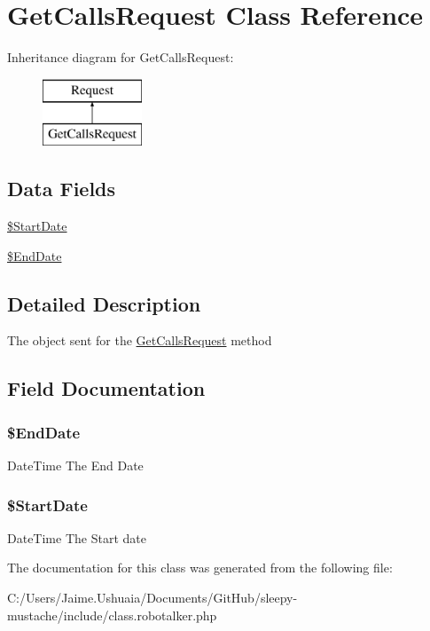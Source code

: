 \hypertarget{class_get_calls_request}{\section{Get\-Calls\-Request Class Reference}
\label{class_get_calls_request}
}
Inheritance diagram for Get\-Calls\-Request\-:\begin{figure}[H]
\begin{center}
\leavevmode
\includegraphics[height=2.000000cm]{class_get_calls_request}
\end{center}
\end{figure}
\subsection*{Data Fields}
\begin{DoxyCompactItemize}
\item 
\hyperlink{class_get_calls_request_a82e0539eeca49a1fbea42227a8f96d31}{\$\-Start\-Date}
\item 
\hyperlink{class_get_calls_request_a3ba74dcdb03b05077309a0b5a0c6788e}{\$\-End\-Date}
\end{DoxyCompactItemize}


\subsection{Detailed Description}
The object sent for the \hyperlink{class_get_calls_request}{Get\-Calls\-Request} method 

\subsection{Field Documentation}
\hypertarget{class_get_calls_request_a3ba74dcdb03b05077309a0b5a0c6788e}{
\subsubsection[{\$\-End\-Date}]{\setlength{\rightskip}{0pt plus 5cm}\$End\-Date}}\label{class_get_calls_request_a3ba74dcdb03b05077309a0b5a0c6788e}
Date\-Time The End Date \hypertarget{class_get_calls_request_a82e0539eeca49a1fbea42227a8f96d31}{
\subsubsection[{\$\-Start\-Date}]{\setlength{\rightskip}{0pt plus 5cm}\$Start\-Date}}\label{class_get_calls_request_a82e0539eeca49a1fbea42227a8f96d31}
Date\-Time The Start date 

The documentation for this class was generated from the following file\-:\begin{DoxyCompactItemize}
\item 
C\-:/\-Users/\-Jaime.\-Ushuaia/\-Documents/\-Git\-Hub/sleepy-\/mustache/include/class.\-robotalker.\-php\end{DoxyCompactItemize}
